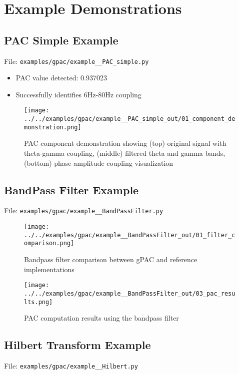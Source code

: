 \documentclass[11pt,a4paper]{article}
\begin{document}
\section{Example Demonstrations}

\subsection{PAC Simple Example}

File: \texttt{examples/gpac/example\_\_PAC\_simple.py}

\begin{itemize}
\item PAC value detected: 0.937023
\item Successfully identifies 6Hz-80Hz coupling
\end{itemize}

\begin{figure}[H]
\centering
\texttt{[image: ../../examples/gpac/example\_\_PAC\_simple\_out/01\_component\_demonstration.png]}
\caption{PAC component demonstration showing (top) original signal with theta-gamma coupling, (middle) filtered theta and gamma bands, (bottom) phase-amplitude coupling visualization}
\end{figure}

\subsection{BandPass Filter Example}

File: \texttt{examples/gpac/example\_\_BandPassFilter.py}

\begin{figure}[H]
\centering
\texttt{[image: ../../examples/gpac/example\_\_BandPassFilter\_out/01\_filter\_comparison.png]}
\caption{Bandpass filter comparison between gPAC and reference implementations}
\end{figure}

\begin{figure}[H]
\centering
\texttt{[image: ../../examples/gpac/example\_\_BandPassFilter\_out/03\_pac\_results.png]}
\caption{PAC computation results using the bandpass filter}
\end{figure}

\subsection{Hilbert Transform Example}

File: \texttt{examples/gpac/example\_\_Hilbert.py}
\end{document}
